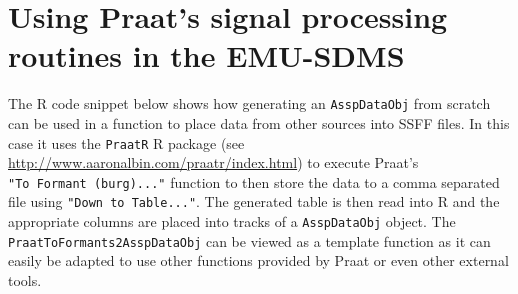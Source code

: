 \documentclass[]{book}
\begin{document}
\hypertarget{sec:app-chap-wrassp-praatsSigProc}{%
\section{Using Praat's signal processing routines in the EMU-SDMS}\label{sec:app-chap-wrassp-praatsSigProc}}

The R code snippet below shows how generating an \texttt{AsspDataObj} from scratch can be used in a function to place data from other sources into SSFF files. In this case it uses the \texttt{PraatR} R package (see \url{http://www.aaronalbin.com/praatr/index.html}) to execute Praat's \texttt{"To\ Formant\ (burg)..."} function to then store the data to a comma separated file using \texttt{"Down\ to\ Table..."}. The generated table is then read into R and the appropriate columns are placed into tracks of a \texttt{AsspDataObj} object. The \texttt{PraatToFormants2AsspDataObj} can be viewed as a template function as it can easily be adapted to use other functions provided by Praat or even other external tools.
\end{document}
